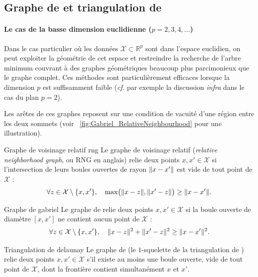\subsection{Graphe de  et triangulation de }

\paragraph{Le cas de la basse dimension euclidienne ($p=2, 3, 4 , \ldots$)}
Dans le cas particulier où les données $\mathcal X \subset \mathbb R^p$ sont dans l'espace euclidien, on peut exploiter la géométrie de cet espace et restreindre la recherche de l'arbre minimum couvrant à des graphes géométriques beaucoup plus parcimonieux que le graphe complet. Ces méthodes sont particulièrement efficaces lorsque la dimension $p$ est suffisamment faible (\emph{cf.} par exemple la discussion \emph{infra} dans le cas du plan $p=2$).

Les arêtes de ces graphes reposent sur une condition de vacuité d'une région entre les deux sommets (voir \Fig~\ref{fig:Gabriel_RelativeNeighbourhood} pour une illustration).

\begin{Definition}{Graphe de voisinage relatif \cite{Toussaint1980}}{rng}
Le graphe de voisinage relatif (\emph{relative neighborhood graph}, ou RNG en anglais) relie deux points $x, x' \in \mathcal X$ si l'intersection de leurs boules ouvertes de rayon $\lVert x-x' \rVert$ est vide de tout point de $\mathcal X$ :
\[
    \forall z \in \mathcal X \setminus \{x,x'\}, \quad \max \bigl( \lVert x-z \rVert, \lVert x'-z \rVert \bigr) \ge \lVert x-x' \rVert.
\]
\end{Definition}

\begin{Definition}{Graphe de  \cite{GabrielSokal1969}}{gabriel}
Le graphe de  relie deux points $x, x' \in \mathcal X$ si la boule ouverte de diamètre $[x,x']$ ne contient aucun point de $\mathcal X$ :
\[
    \forall z \in \mathcal X \setminus \{x,x'\}, \quad \lVert x-z \rVert^2 + \lVert x'-z \rVert^2 \ge \lVert x-x' \rVert^2.
\]
\end{Definition}

\begin{Definition}{Triangulation de  \cite{Delaunay1934, BoissonnatChazalYvinec}}{delaunay}
Le graphe de  (le $1$-squelette de la triangulation de ) relie deux points $x, x' \in \mathcal X$ s'il existe au moins une boule ouverte, vide de tout point de $\mathcal X$, dont la frontière contient simultanément $x$ et $x'$.
\end{Definition}


